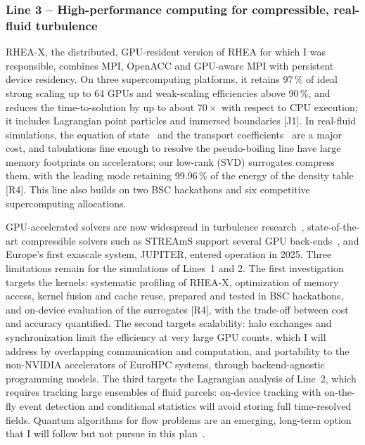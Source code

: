 \documentclass[11pt]{article}
\begin{document}
\subsubsection{Line 3 -- High-performance computing for compressible, real-fluid turbulence}

RHEA-X, the distributed, GPU-resident version of RHEA for which I was responsible, combines MPI,
OpenACC and GPU-aware MPI with persistent device residency. On three supercomputing platforms, it
retains 97\,\% of ideal strong scaling up to 64 GPUs and weak-scaling efficiencies above 90\,\%,
and reduces the time-to-solution by up to about $70\times$ with respect to CPU execution; it
includes Lagrangian point particles and immersed boundaries [J1]. In real-fluid simulations, the
equation of state~\cite{PengRobinson1976} and the transport coefficients~\cite{Chung1988} are a major cost, and tabulations fine enough to
resolve the pseudo-boiling line have large memory footprints on accelerators; our low-rank (SVD)
surrogates compress them, with the leading mode retaining 99.96\,\% of the energy of the density
table [R4]. This line also builds on two BSC hackathons and six competitive supercomputing
allocations.

GPU-accelerated solvers are now widespread in turbulence research~\cite{Roccon2026},
state-of-the-art compressible solvers such as STREAmS support several GPU
back-ends~\cite{Bernardini2021,Bernardini2023}, and Europe's first exascale system, JUPITER,
entered operation in 2025. Three limitations remain for the simulations of Lines~1 and 2. The
first investigation targets the kernels: systematic profiling of RHEA-X, optimization of memory
access, kernel fusion and cache reuse, prepared and tested in BSC hackathons, and on-device
evaluation of the surrogates [R4], with the trade-off between cost and accuracy quantified. The
second targets scalability: halo exchanges and synchronization limit the efficiency at very large
GPU counts, which I will address by overlapping communication and computation, and portability to
the non-NVIDIA accelerators of EuroHPC systems, through backend-agnostic programming models. The
third targets the Lagrangian analysis of Line~2, which requires tracking large ensembles of fluid
parcels: on-device tracking with on-the-fly event detection and conditional statistics will avoid
storing full time-resolved fields. Quantum algorithms for flow problems are an emerging,
long-term option that I will follow but not pursue in this plan~\cite{Bharadwaj2023}.
\end{document}
